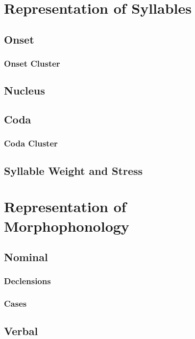 \documentclass{report}
\begin{document}
\chapter{Representation of Syllables}

\section{Onset}

\subsection{Onset Cluster}

\section{Nucleus}

\section{Coda}

\subsection{Coda Cluster}

\section{Syllable Weight and Stress}

\chapter{Representation of Morphophonology}

\section{Nominal}

\subsection{Declensions}

\subsection{Cases}

\section{Verbal}
\end{document}
